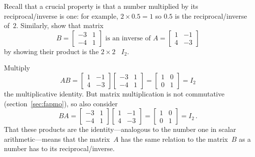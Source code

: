 \begin{example} \label{eg:a2x2inv}
Recall that a crucial property is that a number multiplied by its reciprocal\slash inverse is one: for example, \(2\times 0.5=1\) so \(0.5\) is the reciprocal\slash inverse of~\(2\).
Similarly, show that matrix 
\begin{equation*}
B=\begin{bmatrix} -3&1\\-4&1 \end{bmatrix}
\text{ is an inverse of }
A=\begin{bmatrix} 1&-1\\4&-3 \end{bmatrix}
\end{equation*}
by showing their product is the \(2\times2\) ~\(I_2\).
\begin{solution} 
Multiply 
\begin{equation*}
AB=\begin{bmatrix} 1&-1\\4&-3 \end{bmatrix}
\begin{bmatrix} -3&1\\-4&1 \end{bmatrix}
=\begin{bmatrix} 1&0\\0&1 \end{bmatrix}=I_2
\end{equation*}
the multiplicative identity.  
But matrix multiplication is not commutative (section~\ref{sec:fapmo}), so also consider
\begin{equation*}
BA=\begin{bmatrix} -3&1\\-4&1 \end{bmatrix}
\begin{bmatrix} 1&-1\\4&-3 \end{bmatrix}
=\begin{bmatrix} 1&0\\0&1 \end{bmatrix}=I_2\,.
\end{equation*}
That these products are the identity---analogous to the number one in scalar arithmetic---means that the matrix~\(A\) has the same relation to the matrix~\(B\) as a number has to its reciprocal\slash inverse.
%


\end{solution}
\end{example}
